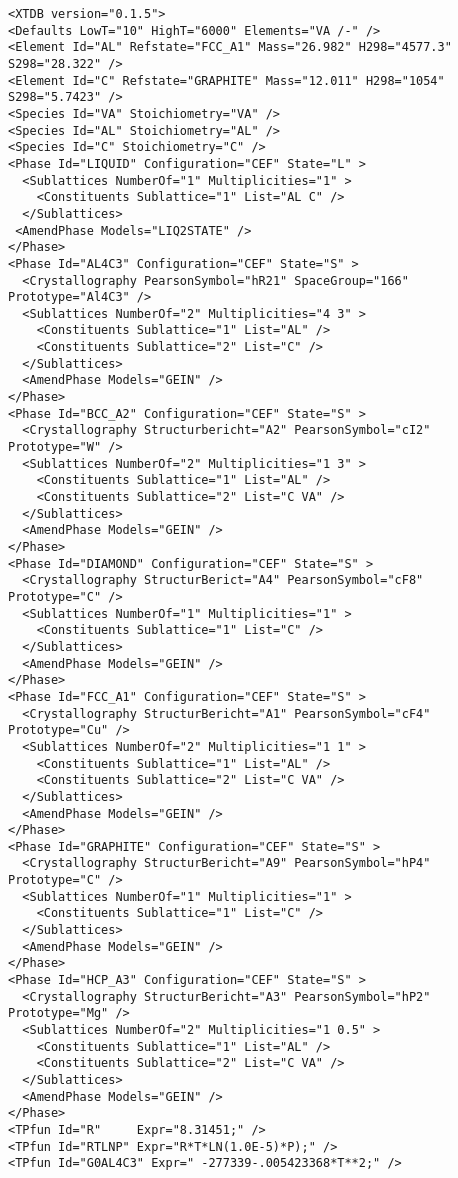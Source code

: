 \documentclass[preprint,review,12pt]{elsarticle}
\begin{document}
\begin{appendix}
{\small
\begin{verbatim}
<XTDB version="0.1.5">
<Defaults LowT="10" HighT="6000" Elements="VA /-" />
<Element Id="AL" Refstate="FCC_A1" Mass="26.982" H298="4577.3" S298="28.322" />
<Element Id="C" Refstate="GRAPHITE" Mass="12.011" H298="1054" S298="5.7423" />
<Species Id="VA" Stoichiometry="VA" />
<Species Id="AL" Stoichiometry="AL" />
<Species Id="C" Stoichiometry="C" />
<Phase Id="LIQUID" Configuration="CEF" State="L" >
  <Sublattices NumberOf="1" Multiplicities="1" >
    <Constituents Sublattice="1" List="AL C" />
  </Sublattices>
 <AmendPhase Models="LIQ2STATE" />
</Phase>
<Phase Id="AL4C3" Configuration="CEF" State="S" >
  <Crystallography PearsonSymbol="hR21" SpaceGroup="166" Prototype="Al4C3" />
  <Sublattices NumberOf="2" Multiplicities="4 3" >
    <Constituents Sublattice="1" List="AL" />
    <Constituents Sublattice="2" List="C" />
  </Sublattices>
  <AmendPhase Models="GEIN" />
</Phase>
<Phase Id="BCC_A2" Configuration="CEF" State="S" >
  <Crystallography Structurbericht="A2" PearsonSymbol="cI2" Prototype="W" />
  <Sublattices NumberOf="2" Multiplicities="1 3" >
    <Constituents Sublattice="1" List="AL" />
    <Constituents Sublattice="2" List="C VA" />
  </Sublattices>
  <AmendPhase Models="GEIN" />
</Phase>
<Phase Id="DIAMOND" Configuration="CEF" State="S" >
  <Crystallography StructurBerict="A4" PearsonSymbol="cF8" Prototype="C" />
  <Sublattices NumberOf="1" Multiplicities="1" >
    <Constituents Sublattice="1" List="C" />
  </Sublattices>
  <AmendPhase Models="GEIN" />
</Phase>
<Phase Id="FCC_A1" Configuration="CEF" State="S" >
  <Crystallography StructurBericht="A1" PearsonSymbol="cF4" Prototype="Cu" />
  <Sublattices NumberOf="2" Multiplicities="1 1" >
    <Constituents Sublattice="1" List="AL" />
    <Constituents Sublattice="2" List="C VA" />
  </Sublattices>
  <AmendPhase Models="GEIN" />
</Phase>
<Phase Id="GRAPHITE" Configuration="CEF" State="S" >
  <Crystallography StructurBericht="A9" PearsonSymbol="hP4"  Prototype="C" />
  <Sublattices NumberOf="1" Multiplicities="1" >
    <Constituents Sublattice="1" List="C" />
  </Sublattices>
  <AmendPhase Models="GEIN" />
</Phase>
<Phase Id="HCP_A3" Configuration="CEF" State="S" >
  <Crystallography StructurBericht="A3" PearsonSymbol="hP2" Prototype="Mg" />
  <Sublattices NumberOf="2" Multiplicities="1 0.5" >
    <Constituents Sublattice="1" List="AL" />
    <Constituents Sublattice="2" List="C VA" />
  </Sublattices>
  <AmendPhase Models="GEIN" />
</Phase>
<TPfun Id="R"     Expr="8.31451;" />
<TPfun Id="RTLNP" Expr="R*T*LN(1.0E-5)*P);" />
<TPfun Id="G0AL4C3" Expr=" -277339-.005423368*T**2;" /> 

\end{verbatim}}
\end{appendix}
\end{document}
